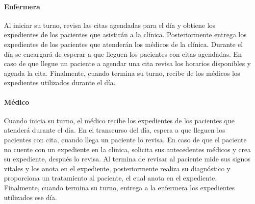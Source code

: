 \paragraph{Enfermera}
Al iniciar su turno, revisa las citas agendadas para el día y obtiene los expedientes de los pacientes que asistirán a la clínica. Posteriormente entrega los expedientes de los pacientes que atenderán los médicos de la clínica. Durante el día se encargará de esperar a que lleguen los pacientes con citas agendadas. En caso de que llegue un paciente a agendar una cita revisa los horarios disponibles y agenda la cita. Finalmente, cuando termina su turno, recibe de los médicos los expedientes utilizados durante el día.
\paragraph{Médico}
Cuando inicia su turno, el médico recibe los expedientes de los pacientes que atenderá durante el día. En el transcurso del día, espera a que lleguen los pacientes con cita, cuando llega un paciente lo revisa. En caso de que el paciente no cuente con un expediente en la clínica, solicita sus antecedentes médicos y crea su expediente, después lo revisa. Al termina de revisar al paciente mide sus signos vitales y los anota en el expediente, posteriormente realiza su diagnóstico y proporciona un tratamiento al paciente, el cual anota en el expediente. Finalmente, cuando termina su turno, entrega a la enfermera los expedientes utilizados ese día.

